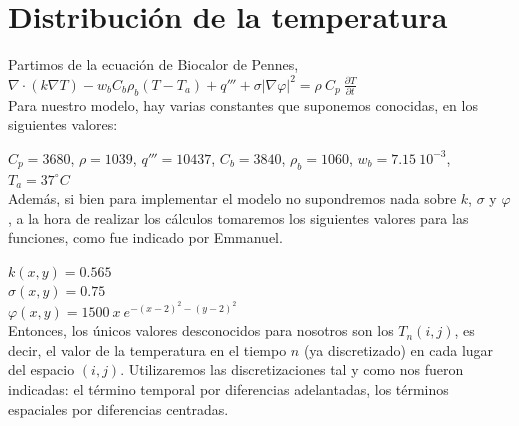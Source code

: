 \documentclass[a4paper]{article}
\begin{document}
\newtheorem{teo}{Teorema}[section]
\newtheorem{propo}{Proposici\'{o}n}[section]
\newtheorem{lema}{Lema}[section]
\newtheorem{coro}{Corolario}[section]
\newtheorem{defi}{Definici\'{o}n}[section]

\newpage
\setcounter{page}{1}
\pagestyle{plain}

\newpage


\newcommand{\Asig}{\ensuremath{\leftarrow}}
\newcommand{\AndY}{\ensuremath{\wedge}}
\newcommand{\Or}{\ensuremath{\vee}}
\newcommand{\Not}{\ensuremath{\neg}}
\newcommand{\NotEq}{\ensuremath{\neq}}
\newcommand{\MayorIg}{\ensuremath{\geq}}
\newcommand{\tabu}{\hspace*{0.7cm}}
\newcommand{\ctabu}{\hspace*{0.8cm}}
\newcommand{\htabu}{\hspace*{0.35cm}}
\newcommand{\moduloNombre}[1]{\textbf{#1}}

\section{Distribuci\'on de la temperatura}

Partimos de la ecuación de Biocalor de Pennes, 
$\nabla \cdot (k \nabla T) - w_b C_b \rho_b (T-T_a) + q''' + \sigma |\nabla \varphi|^2 = \rho \ C_p \ \frac{\partial T}{\partial t}$ \\

Para nuestro modelo, hay varias constantes que suponemos conocidas, en los siguientes valores:

$C_p= 3680$, $\rho= 1039$, $q'''= 10437$, $C_b= 3840$, $\rho_b= 1060$, $w_b=7.15 \ 10^{-3}$, $T_a = 37^\circ C$ \\

Además, si bien para implementar el modelo no supondremos nada sobre $k$, $\sigma$ y $\varphi$, a la hora de realizar los cálculos tomaremos los siguientes valores para las funciones,
como fue indicado por Emmanuel. 

$k(x,y)=0.565$ \\
$\sigma(x,y)=0.75$ \\
$\varphi(x,y)=1500 \ x \ e^{-(x-2)^2-(y-2)^2}$ \\

Entonces, los únicos valores desconocidos para nosotros son los $T_n(i,j)$, es decir, el valor de la temperatura en el tiempo $n$ (ya discretizado) en cada lugar del espacio $(i,j)$.
Utilizaremos las discretizaciones tal y como nos fueron indicadas: el término temporal por diferencias adelantadas, los términos espaciales por diferencias centradas. \\
\end{document}
